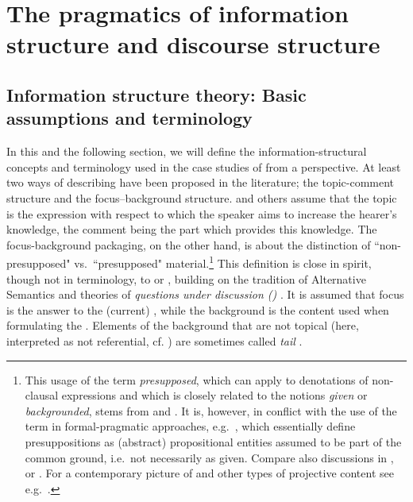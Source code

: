 \documentclass[output=paper,
,modfonts
,nonflat]{langsci/langscibook}
\begin{document}
\section{The pragmatics of information structure and discourse structure}

\subsection{Information structure theory: Basic assumptions and terminology}\label{sect:is_theory}

In this and the following section, we will define the information-structural concepts and terminology used in the case studies of  from a  perspective. At least two ways of describing  have been proposed in the literature; the topic-comment structure and the focus–background structure. \cite{Lambrecht1994} and others assume that the topic is the expression with respect to which the speaker aims to increase the hearer’s knowledge, the comment being the part which provides this knowledge. The focus-background packaging, on the other hand, is about the distinction of ``non-presupposed" vs.\ ``presupposed" material.\footnote{This usage of the term \textit{presupposed}, which can apply to denotations of non-clausal expressions and which is closely related to the notions \textit{given} or \textit{backgrounded}, stems from \cite{chono71} and \cite{jacra72}. It is, however, in conflict with the use of the term in formal-pragmatic approaches, e.g.\ \cite{karla74,staro74}, which essentially define presuppositions as (abstract) propositional entities assumed to be part of the common ground, i.e.\ not necessarily as given. Compare also discussions in \cite[150f.]{Lambrecht1994}, \cite{wagmi12} or \cite[237f.]{riear15}. For a contemporary picture of  and other types of projective content see e.g.\ \cite{tonju13}.} This definition is close in spirit, though not in terminology, to \cite{riear18a} or \cite{riear18b}, building on the tradition of Alternative Semantics \citep{rooma92} and theories of \textit{questions under discussion ()} \citep{bueda03,bueda16,beada08,robcr12}. It is assumed that focus is the answer to the (current) , while the background is the content used when formulating the . Elements of the background that are not topical (here, interpreted as not referential, cf. \citealt{jacjo01}) are sometimes called \textit{tail} \citep[cf.][]{valen96}.
\end{document}
